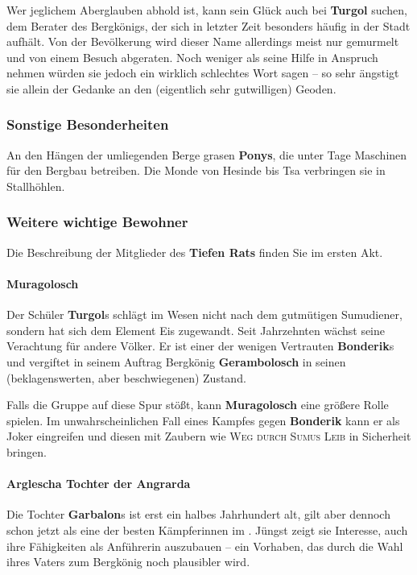 Wer jeglichem Aberglauben abhold ist, kann sein Glück auch bei \textbf{Turgol} suchen, dem Berater des Bergkönigs, der sich in letzter Zeit besonders häufig in der Stadt aufhält.
Von der Bevölkerung wird dieser Name allerdings meist nur gemurmelt und von einem Besuch abgeraten.
Noch weniger als seine Hilfe in Anspruch nehmen würden sie jedoch ein wirklich schlechtes Wort sagen -- so sehr ängstigt sie allein der Gedanke an den (eigentlich sehr gutwilligen) Geoden.

\subsubsection{Sonstige Besonderheiten}
An den Hängen der umliegenden Berge grasen \textbf{Ponys}, die unter Tage Maschinen für den Bergbau betreiben. Die Monde von Hesinde bis Tsa verbringen sie in Stallhöhlen.


\subsubsection{Weitere wichtige Bewohner}

Die Beschreibung der Mitglieder des \textbf{Tiefen Rats} finden Sie im ersten Akt. 

\paragraph{\textbf{Muragolosch}}

Der Schüler \textbf{Turgol}s schlägt im Wesen nicht nach dem gutmütigen Sumudiener, sondern hat sich dem Element Eis zugewandt.
Seit Jahrzehnten wächst seine Verachtung für andere Völker.
Er ist einer der wenigen Vertrauten \textbf{Bonderik}s und vergiftet in seinem Auftrag Bergkönig \textbf{Gerambolosch} in seinen (beklagenswerten, aber beschwiegenen) Zustand.

Falls die Gruppe auf diese Spur stößt, kann \textbf{Muragolosch} eine größere Rolle spielen. Im unwahrscheinlichen Fall eines Kampfes gegen \textbf{Bonderik} kann er als Joker eingreifen und diesen mit Zaubern wie \textsc{Weg durch Sumus Leib} in Sicherheit bringen.

\paragraph{\textbf{Arglescha Tochter der Angrarda}}

Die Tochter \textbf{Garbalon}s ist erst ein halbes Jahrhundert alt, gilt aber dennoch schon jetzt als eine der besten Kämpferinnen im \fkv.
Jüngst zeigt sie Interesse, auch ihre Fähigkeiten als Anführerin auszubauen -- ein Vorhaben, das durch die Wahl ihres Vaters zum Bergkönig noch plausibler wird.

